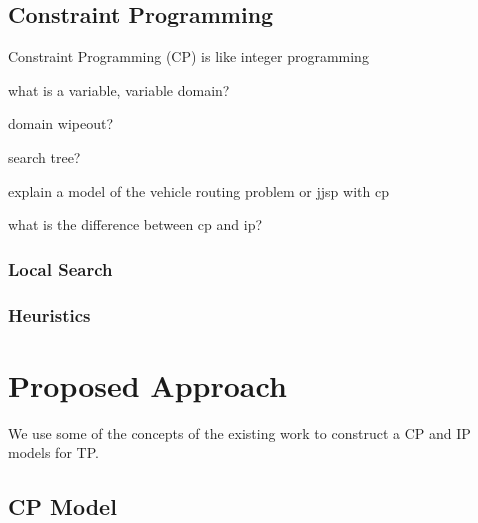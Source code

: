 \documentclass{mprop}
\theoremstyle{definition}
\begin{document}




\subsection{Constraint Programming}
\label{cp}
Constraint Programming (CP) is like integer programming

what is a variable, variable domain?

domain wipeout?

search tree?

explain a model of the vehicle routing problem or jjsp with cp

what is the difference between cp and ip?

\subsubsection{Local Search}
\subsubsection{Heuristics}

\section{Proposed Approach}
We use some of the concepts of the existing work to construct a CP and IP models for TP.

\subsection{CP Model}
\end{document}
